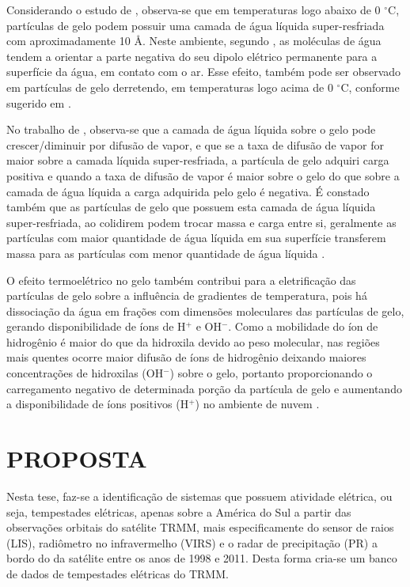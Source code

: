 Considerando o estudo de , observa-se que em temperaturas logo abaixo de 0 $^{\circ}$C, partículas de gelo podem possuir uma camada de água líquida super-resfriada com aproximadamente 10 {\AA}. Neste ambiente, segundo , as moléculas de água tendem a orientar a parte negativa do seu dipolo elétrico permanente para a superfície da água, em contato com o ar. Esse efeito, também pode ser observado em partículas de gelo derretendo, em temperaturas logo acima de 0 $^{\circ}$C, conforme sugerido em \cite{fletcher}.

No trabalho de , observa-se que a camada de água líquida sobre o gelo pode crescer/diminuir por difusão de vapor, e que se a taxa de difusão de vapor for maior sobre a camada líquida super-resfriada, a partícula de gelo adquiri carga positiva e quando a taxa de difusão de vapor é maior sobre o gelo do que sobre a camada de água líquida a carga adquirida pelo gelo é negativa. É constado também que as partículas de gelo que possuem esta camada de água líquida super-resfriada, ao colidirem podem trocar massa e carga entre si, geralmente as partículas com maior quantidade de água líquida em sua superfície transferem massa para as partículas com menor quantidade de água líquida \cite{baker1994}. 


O efeito termoelétrico no gelo também contribui para a eletrificação das partículas de gelo sobre a influência de gradientes de temperatura, pois há dissociação da água em frações com dimensões moleculares das partículas de gelo, gerando disponibilidade de íons de H$^{+}$ e OH$^{-}$. Como a mobilidade do íon de hidrogênio é maior do que da hidroxila devido ao peso molecular, nas regiões mais quentes ocorre maior difusão de íons de hidrogênio deixando maiores concentrações de hidroxilas (OH$^{-}$) sobre o gelo, portanto proporcionando o carregamento negativo de determinada porção da partícula de gelo e aumentando a disponibilidade de íons positivos (H$^{+}$) no ambiente de nuvem \cite{latham1961}.  

\section{PROPOSTA}

Nesta tese, faz-se a identificação de sistemas que possuem atividade elétrica, ou seja, tempestades elétricas, apenas sobre a América do Sul  a partir das observações orbitais do satélite TRMM, mais especificamente do sensor de raios (LIS), radiômetro no infravermelho (VIRS) e o radar de precipitação (PR) a bordo do da satélite entre os anos de 1998 e 2011. Desta forma cria-se um banco de dados de tempestades elétricas do TRMM.

